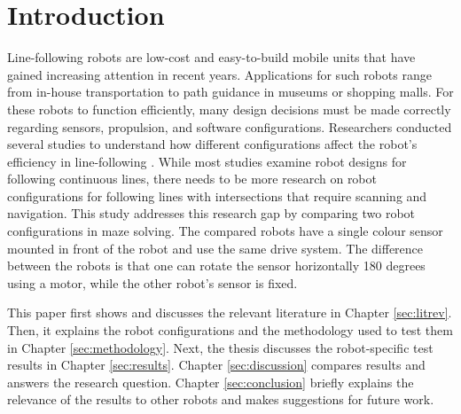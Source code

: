\section{Introduction} \label{sec:introduction}

Line-following robots are low-cost and easy-to-build mobile units that have gained increasing attention in recent years. Applications for such robots range from in-house transportation to path guidance in museums or shopping malls. For these robots to function efficiently, many design decisions must be made correctly regarding sensors, propulsion, and software configurations. Researchers conducted several studies to understand how different configurations affect the robot's efficiency in line-following \cite{baharuddin, pakdaman, almeida}. While most studies examine robot designs for following continuous lines, there needs to be more research on robot configurations for following lines with intersections that require scanning and navigation. This study addresses this research gap by comparing two robot configurations in maze solving. The compared robots have a single colour sensor mounted in front of the robot and use the same drive system. The difference between the robots is that one can rotate the sensor horizontally 180 degrees using a motor, while the other robot's sensor is fixed.

This paper first shows and discusses the relevant literature in Chapter \ref{sec:litrev}. Then, it explains the robot configurations and the methodology used to test them in Chapter \ref{sec:methodology}. Next, the thesis discusses the robot-specific test results in Chapter \ref{sec:results}. 
Chapter \ref{sec:discussion} compares results and answers the research question. Chapter \ref{sec:conclusion} briefly explains the relevance of the results to other robots and makes suggestions for future work.
